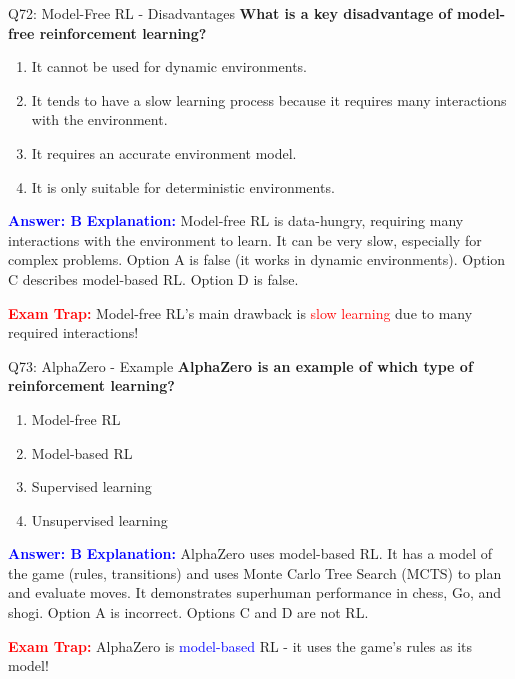 \documentclass[8pt]{beamer}
\begin{document}
	\begin{frame}{Q72: Model-Free RL - Disadvantages}
		\fontsize{6.5}{7.5}\selectfont
		\textbf{What is a key disadvantage of model-free reinforcement learning?}
		
		\begin{enumerate}
			\item It cannot be used for dynamic environments.
			\item It tends to have a slow learning process because it requires many interactions with the environment.
			\item It requires an accurate environment model.
			\item It is only suitable for deterministic environments.
		\end{enumerate}
		
		\vspace{0.1cm}
		\textcolor{blue}{\textbf{Answer: B}}
		\vspace{0.1cm}
		\textcolor{blue}{\textbf{Explanation:}} Model-free RL is data-hungry, requiring many interactions with the environment to learn. It can be very slow, especially for complex problems. Option A is false (it works in dynamic environments). Option C describes model-based RL. Option D is false.
		
		\textcolor{red}{\textbf{Exam Trap:}} Model-free RL's main drawback is \textcolor{red}{slow learning} due to many required interactions!
	\end{frame}
	
	\begin{frame}{Q73: AlphaZero - Example}
		\fontsize{6.5}{7.5}\selectfont
		\textbf{AlphaZero is an example of which type of reinforcement learning?}
		
		\begin{enumerate}
			\item Model-free RL
			\item Model-based RL
			\item Supervised learning
			\item Unsupervised learning
		\end{enumerate}
		
		\vspace{0.1cm}
		\textcolor{blue}{\textbf{Answer: B}}
		\vspace{0.1cm}
		\textcolor{blue}{\textbf{Explanation:}} AlphaZero uses model-based RL. It has a model of the game (rules, transitions) and uses Monte Carlo Tree Search (MCTS) to plan and evaluate moves. It demonstrates superhuman performance in chess, Go, and shogi. Option A is incorrect. Options C and D are not RL.
		
		\textcolor{red}{\textbf{Exam Trap:}} AlphaZero is \textcolor{blue}{model-based} RL - it uses the game's rules as its model!
	\end{frame}
	
\end{document}
